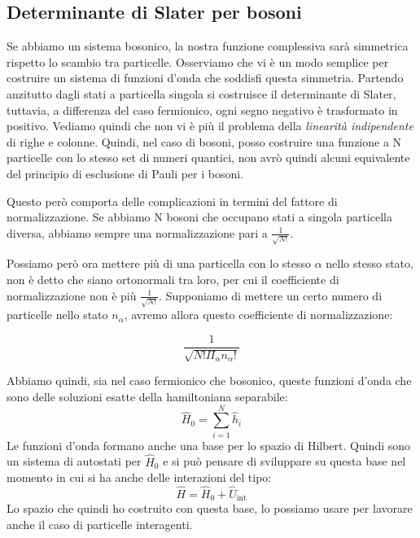 \subsection*{Determinante di Slater per bosoni}
Se abbiamo un sistema bosonico, la nostra funzione complessiva sarà simmetrica rispetto lo scambio tra particelle. Osserviamo che vi è un modo semplice per costruire un sistema di funzioni d'onda che soddisfi questa simmetria. Partendo anzitutto dagli stati a particella singola si costruisce il determinante di Slater, tuttavia, a differenza del caso fermionico, ogni segno negativo è trasformato in positivo. Vediamo quindi che non vi è più il problema della \textit{linearità indipendente} di righe e colonne. Quindi, nel caso di bosoni, posso costruire una funzione a N particelle con lo stesso set di numeri quantici, non avrò quindi alcuni equivalente del principio di esclusione di Pauli per i bosoni.

Questo però comporta delle complicazioni in termini del fattore di normalizzazione. Se abbiamo N bosoni che occupano stati a singola particella diversa, abbiamo sempre una normalizzazione pari a $\frac{1}{\sqrt{N!}}$.

Possiamo però ora mettere più di una particella con lo stesso $\alpha$ nello stesso stato, non è detto che siano ortonormali tra loro, per cui il coefficiente di normalizzazione non è più $\frac{1}{\sqrt{N!}}$. Supponiamo di mettere un certo numero di particelle nello stato $n_\alpha$, avremo allora questo coefficiente di normalizzazione:

\begin{equation*}
    \frac{1}{\sqrt{N!\Pi_\alpha n_\alpha!}}
\end{equation*}

Abbiamo quindi, sia nel caso fermionico che bosonico, queste funzioni d'onda che sono delle soluzioni esatte della hamiltoniana separabile:
\begin{equation*}
    \hat H_0 = \sum_{i=1}^N \hat h_i
\end{equation*}
Le funzioni d'onda formano anche una base per lo spazio di Hilbert. Quindi sono un sistema di autostati per $\hat H_0$ e si può pensare di sviluppare su questa base nel momento in cui si ha anche delle interazioni del tipo:
\begin{equation*}
    \hat H = \hat H_0 + \hat U_{\text{int}}
\end{equation*}
Lo spazio che quindi ho costruito con questa base, lo possiamo usare per lavorare anche il caso di particelle interagenti.

